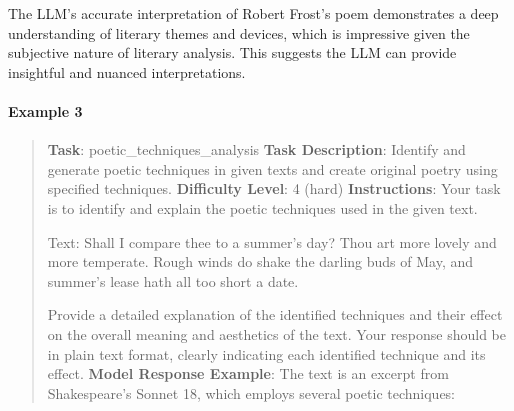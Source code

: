 \documentclass[fleqn,10pt]{wlscirep}
\begin{document}
The LLM's accurate interpretation of Robert Frost's poem demonstrates a
deep understanding of literary themes and devices, which is impressive
given the subjective nature of literary analysis. This suggests the LLM
can provide insightful and nuanced interpretations.

\hypertarget{example-3-6}{%
\paragraph{Example 3}\label{example-3-6}}

\begin{quote}
\textbf{Task}: poetic\_techniques\_analysis \textbf{Task Description}:
Identify and generate poetic techniques in given texts and create
original poetry using specified techniques. \textbf{Difficulty Level}: 4
(hard) \textbf{Instructions}: Your task is to identify and explain the
poetic techniques used in the given text.

Text: Shall I compare thee to a summer's day? Thou art more lovely and
more temperate. Rough winds do shake the darling buds of May, and
summer's lease hath all too short a date.

Provide a detailed explanation of the identified techniques and their
effect on the overall meaning and aesthetics of the text. Your response
should be in plain text format, clearly indicating each identified
technique and its effect. \textbf{Model Response Example}: The text is
an excerpt from Shakespeare's Sonnet 18, which employs several poetic
techniques:


\end{quote}
\end{document}
